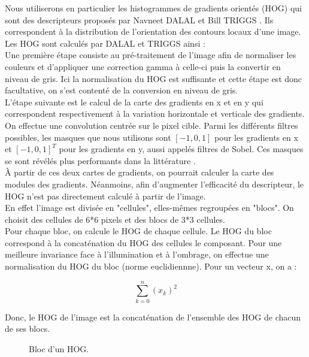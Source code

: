 Nous utiliserons en particulier les histogrammes de gradients orientés (HOG) qui sont des descripteurs proposés par Navneet DALAL et Bill TRIGGS \cite{dalal_histograms_2005}. Ils correspondent à la distribution de l'orientation des contours locaux d'une image. \\

Les HOG sont calculés par DALAL et TRIGGS ainsi : \\

Une première étape consiste au pré-traitement de l'image afin de normaliser les couleurs et d'appliquer une correction gamma à celle-ci puis la convertir en niveau de gris. Ici la normalisation du HOG est suffisante et cette étape est donc facultative, on s'est contenté de la conversion en niveau de gris. \\

L'étape suivante est le calcul de la carte des gradients en x et en y qui correspondent respectivement à la variation horizontale et verticale des gradients. On effectue une convolution centrée sur le pixel cible. Parmi les différents filtres possibles, les masques que nous utilisons sont $[-1, 0, 1]$ pour les gradients en x et $[-1, 0, 1]^{T}$ pour les gradients en y, aussi appelés filtres de Sobel. Ces masques se sont révélés plus performants dans la littérature \cite{dalal_histograms_2005}.\\

À partir de ces deux cartes de gradients, on pourrait calculer la carte des modules des gradients. Néanmoins, afin d'augmenter l'efficacité du descripteur, le HOG n'est pas directement calculé à partir de l'image.\\

En effet l'image est divisée en "cellules", elles-mêmes regroupées en "blocs". On choisit des cellules de 6*6 pixels et des blocs de 3*3 cellules.\\

Pour chaque bloc, on calcule le HOG de chaque cellule. Le HOG du bloc correspond à la concaténation du HOG des cellules le composant. Pour une meilleure invariance face à l'illumination et à l'ombrage, on effectue une normalisation du HOG du bloc (norme euclidiennne). Pour un vecteur x, on a :

\[ \sum_{k=0}^{n} (x_{k})^{2} \]

Donc, le HOG de l'image est la concaténation de l'ensemble des HOG de chacun de ses blocs.

\begin{figure}[!htbp]
\center
\caption{Bloc d'un HOG.}
\label{fig:cuttlefish_bloccells}
\end{figure}
\FloatBarrier

